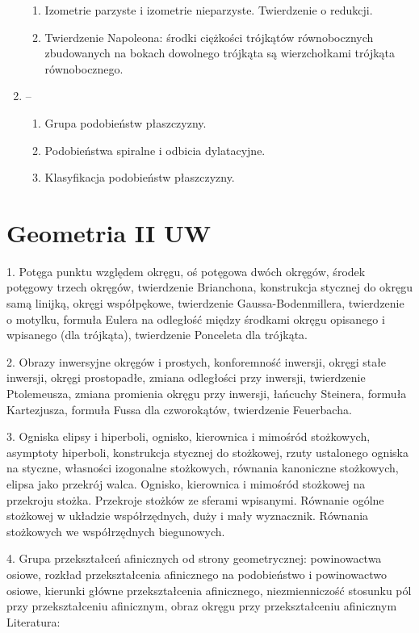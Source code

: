 \documentclass{parchment}
\begin{document}
\begin{enumerate}
\begin{enumerate}
		\item Izometrie parzyste i izometrie nieparzyste. Twierdzenie o redukcji.
		\item Twierdzenie Napoleona: środki ciężkości trójkątów równobocznych zbudowanych na bokach dowolnego trójkąta są wierzchołkami trójkąta równobocznego.
	\end{enumerate}
	\item -- \begin{enumerate}
		\item Grupa podobieństw płaszczyzny.
		\item Podobieństwa spiralne i odbicia dylatacyjne.
		\item Klasyfikacja podobieństw płaszczyzny.
	\end{enumerate}
\end{enumerate}

\section{Geometria II UW}
1. Potęga punktu względem okręgu, oś potęgowa dwóch okręgów, środek potęgowy trzech okręgów, twierdzenie Brianchona, konstrukcja stycznej do okręgu samą linijką, okręgi współpękowe, twierdzenie Gaussa-Bodenmillera, twierdzenie o motylku, formuła Eulera na odległość między środkami okręgu opisanego i wpisanego (dla trójkąta), twierdzenie Ponceleta dla trójkąta.

2. Obrazy inwersyjne okręgów i prostych, konforemność inwersji, okręgi stałe inwersji, okręgi prostopadłe, zmiana odległości przy inwersji, twierdzenie Ptolemeusza, zmiana promienia okręgu przy inwersji, łańcuchy Steinera, formuła Kartezjusza, formuła Fussa dla czworokątów, twierdzenie Feuerbacha.

3. Ogniska elipsy i hiperboli, ognisko, kierownica i mimośród stożkowych, asymptoty hiperboli, konstrukcja stycznej do stożkowej, rzuty ustalonego ogniska na styczne, własności izogonalne stożkowych, równania kanoniczne stożkowych, elipsa jako przekrój walca. Ognisko, kierownica i mimośród stożkowej na przekroju stożka. Przekroje stożków ze sferami wpisanymi. Równanie ogólne stożkowej w układzie współrzędnych, duży i mały wyznacznik. Równania stożkowych we współrzędnych biegunowych.

4. Grupa przekształceń afinicznych od strony geometrycznej: powinowactwa osiowe, rozkład przekształcenia afinicznego na podobieństwo i powinowactwo osiowe, kierunki główne przekształcenia afinicznego, niezmienniczość stosunku pól przy przekształceniu afinicznym, obraz okręgu przy przekształceniu afinicznym
Literatura: 	
\end{document}
